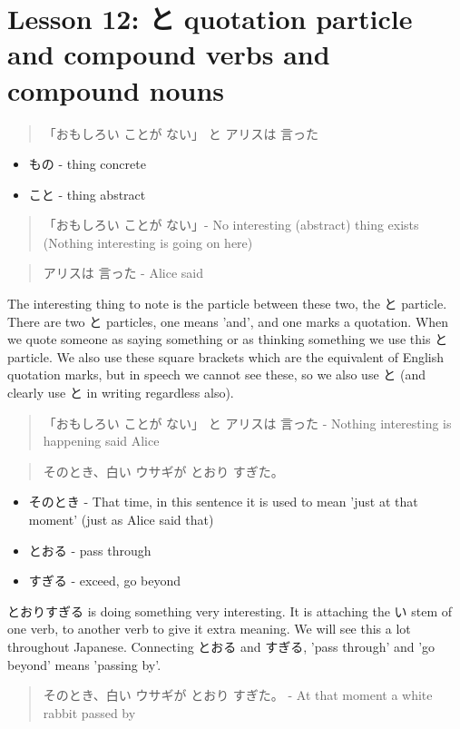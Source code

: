 \documentclass[11pt]{article}
\begin{document}
\section{Lesson 12: と quotation particle and compound verbs and compound nouns}
\label{sec:org38484d3}
\begin{quote}
「おもしろい ことが ない」 と アリスは 言った
\end{quote}
\begin{itemize}
\item もの - thing concrete
\item こと - thing abstract
\end{itemize}

\begin{quote}
「おもしろい ことが ない」- No interesting (abstract) thing exists (Nothing interesting is going on here)
\end{quote}
\begin{quote}
アリスは 言った - Alice said
\end{quote}
The interesting thing to note is the particle between these two, the と particle. There are two と particles, one means 'and', and one marks a quotation. When we quote someone as saying something or as thinking something we use this と particle. We also use these square brackets which are the equivalent of English quotation marks, but in speech we cannot see these, so we also use と (and clearly use と in writing regardless also).
\begin{quote}
「おもしろい ことが ない」 と アリスは 言った - Nothing interesting is happening said Alice
\end{quote}

\begin{quote}
そのとき、白い ウサギが とおり すぎた。
\end{quote}
\begin{itemize}
\item そのとき - That time, in this sentence it is used to mean 'just at that moment' (just as Alice said that)
\item とおる - pass through
\item すぎる - exceed, go beyond
\end{itemize}

とおりすぎる is doing something very interesting. It is attaching the い stem of one verb, to another verb to give it extra meaning. We will see this a lot throughout Japanese. Connecting とおる and すぎる, 'pass through' and 'go beyond' means 'passing by'.
\begin{quote}
そのとき、白い ウサギが とおり すぎた。 - At that moment a white rabbit passed by
\end{quote}
\end{document}
